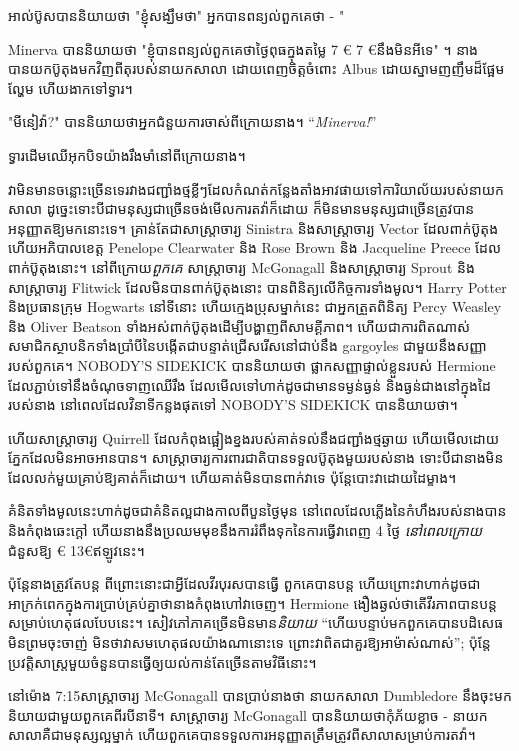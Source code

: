 អាល់ប៊ូសបាននិយាយថា "ខ្ញុំសង្ឃឹមថា" អ្នកបានពន្យល់ពួកគេថា - "

Minerva បាននិយាយថា "ខ្ញុំបានពន្យល់ពួកគេថាថ្ងៃពុធក្នុងតម្លៃ 7 € 7 €នឹងមិនអីទេ" ។ នាងបានយកប៊ូតុងមកវិញពីតុរបស់នាយកសាលា ដោយពេញចិត្តចំពោះ Albus ដោយស្នាមញញឹមដ៏ផ្អែមល្ហែម ហើយងាកទៅទ្វារ។

"មីនៀវ៉ា?" បាននិយាយថាអ្នកជំនួយការចាស់ពីក្រោយនាង។ “\emph{Minerva!}”

ទ្វារដើមឈើអុកបិទយ៉ាងរឹងមាំនៅពីក្រោយនាង។

\later

វាមិនមានចន្លោះច្រើនទេរវាងជញ្ជាំងថ្មខ្លីៗដែលកំណត់កន្លែងតាំងអាវផាយទៅការិយាល័យរបស់នាយកសាលា ដូច្នេះទោះបីជាមនុស្សជាច្រើនចង់មើលការតវ៉ាក៏ដោយ ក៏មិនមានមនុស្សជាច្រើនត្រូវបានអនុញ្ញាតឱ្យមកនោះទេ។ គ្រាន់តែជាសាស្រ្តាចារ្យ Sinistra និងសាស្រ្តាចារ្យ Vector ដែលពាក់ប៊ូតុង ហើយអភិបាលខេត្ត Penelope Clearwater និង Rose Brown និង Jacqueline Preece ដែលពាក់ប៊ូតុងនោះ។ នៅពីក្រោយ\emph{ពួកគេ} សាស្រ្តាចារ្យ McGonagall និងសាស្រ្តាចារ្យ Sprout និងសាស្រ្តាចារ្យ Flitwick ដែលមិនបានពាក់ប៊ូតុងនោះ បានពិនិត្យលើកិច្ចការទាំងមូល។ Harry Potter និងប្រធានក្រុម Hogwarts នៅទីនោះ ហើយក្មេងប្រុសម្នាក់នេះ ជាអ្នកត្រួតពិនិត្យ Percy Weasley និង Oliver Beatson ទាំងអស់ពាក់ប៊ូតុងដើម្បីបង្ហាញពីសាមគ្គីភាព។ ហើយជាការពិតណាស់ សមាជិកស្ថាបនិកទាំងប្រាំបីនៃ\SPHEW បង្កើតជាបន្ទាត់ជ្រើសរើសនៅជាប់នឹង gargoyles ជាមួយនឹងសញ្ញារបស់ពួកគេ។ NOBODY'S SIDEKICK បាននិយាយថា ផ្លាកសញ្ញាផ្ទាល់ខ្លួនរបស់ Hermione ដែលភ្ជាប់ទៅនឹងចំណុចទាញឈើរឹង ដែលមើលទៅហាក់ដូចជាមានទម្ងន់ធ្ងន់ និងធ្ងន់ជាងនៅក្នុងដៃរបស់នាង នៅពេលដែលវិនាទីកន្លងផុតទៅ NOBODY'S SIDEKICK បាននិយាយថា។

ហើយសាស្រ្តាចារ្យ Quirrell ដែលកំពុងផ្អៀងខ្នងរបស់គាត់ទល់នឹងជញ្ជាំងថ្មឆ្ងាយ ហើយមើលដោយភ្នែកដែលមិនអាចអានបាន។ សាស្ត្រាចារ្យការពារជាតិបានទទួលប៊ូតុងមួយរបស់នាង ទោះបីជានាងមិនដែលលក់មួយគ្រាប់ឱ្យគាត់ក៏ដោយ។ ហើយ​គាត់​មិន​បាន​ពាក់​វា​ទេ ប៉ុន្តែ​បោះ​វា​ដោយ​ដៃ​ម្ខាង។

គំនិតទាំងមូលនេះហាក់ដូចជាគំនិតល្អជាងកាលពីបួនថ្ងៃមុន នៅពេលដែលភ្លើងនៃកំហឹងរបស់នាងបាននិងកំពុងឆេះក្តៅ ហើយនាងនឹងប្រឈមមុខនឹងការរំពឹងទុកនៃការធ្វើវាពេញ 4 ថ្ងៃ \emph{នៅពេលក្រោយ} ជំនួសឱ្យ € 13€{ឥឡូវនេះ}។

ប៉ុន្តែនាងត្រូវតែបន្ត ពីព្រោះនោះជាអ្វីដែលវីរបុរសបានធ្វើ ពួកគេបានបន្ត ហើយព្រោះវាហាក់ដូចជាអាក្រក់ពេកក្នុងការប្រាប់គ្រប់គ្នាថានាងកំពុងហៅវាចេញ។ Hermione ងឿងឆ្ងល់ថាតើវីរភាពបានបន្តសម្រាប់ហេតុផលបែបនេះ។ សៀវភៅភាគច្រើនមិនមាន\emph{និយាយ} “ហើយបន្ទាប់មកពួកគេបានបដិសេធមិនព្រមចុះចាញ់ មិនថាវាសមហេតុផលយ៉ាងណានោះទេ ព្រោះវាពិតជាគួរឱ្យអាម៉ាស់ណាស់”; ប៉ុន្តែ​ប្រវត្តិសាស្ត្រ​មួយ​ចំនួន​បាន​ធ្វើ​ឲ្យ​យល់​កាន់តែ​ច្រើន​តាម​វិធី​នោះ។

នៅម៉ោង 7:15\pm សាស្ត្រាចារ្យ McGonagall បានប្រាប់នាងថា នាយកសាលា Dumbledore នឹងចុះមកនិយាយជាមួយពួកគេពីរបីនាទី។ សាស្រ្តាចារ្យ McGonagall បាននិយាយថាកុំភ័យខ្លាច - នាយកសាលាគឺជាមនុស្សល្អម្នាក់ ហើយពួកគេបានទទួលការអនុញ្ញាតត្រឹមត្រូវពីសាលាសម្រាប់ការតវ៉ា។

